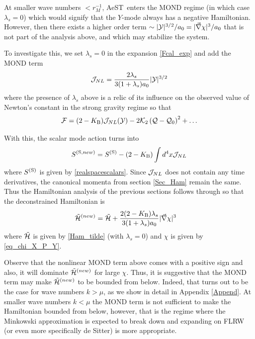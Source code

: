 \documentclass[twocolumn,prd,preprintnumbers,amsmath,amssymb,nofootinbib,superscriptaddress]{revtex4-1}
\newcommand{\scal}{\ensuremath{{\rm S}}}
\newcommand{\grad}{\ensuremath{\vec{\nabla}}}
\newcommand{\AeST}{AeST~}
\newcommand{\lambdas}{\lambda_s}
\newcommand{\Kcal}{{\cal K}}
\newcommand{\Fcal}{{\cal F}}
\newcommand{\Qcal}{{\cal Q}}
\newcommand{\Ycal}{{\cal Y}}
\newcommand{\Hcal}{{\cal H}}
\newcommand{\Jcal}{{\cal J}}
\newcommand{\KB}{\ensuremath{K_{{\rm B}}}}
\begin{document}
At smaller wave numbers $<r_M^{-1}$, \AeST enters the MOND regime (in which case $\lambdas=0$) which would signify that the $Y$-mode always has a negative Hamiltonian. 
However,  then there exists a higher order term $\sim |\Ycal|^{3/2}/a_0 = |\grad \chi|^3/a_0$ that is not part of the analysis above, and  which may stabilize the system.


To investigate this, we set $\lambdas=0$ in the expansion  \eqref{Fcal_exp} and add the MOND term
\begin{align}
\Jcal_{NL} =  \frac{2\lambdas}{3 (1+\lambdas) a_0} |\Ycal|^{3/2}
\end{align}
 where the presence of $\lambdas$ above is a relic of its influence on the observed value of Newton's constant in the strong gravity regime
so that
\begin{equation}
\Fcal =  (2-\KB)  \Jcal_{NL}(\Ycal)  - 2 \Kcal_2  \left(\Qcal - \Qcal_0\right)^2 + \ldots
\label{Fcal_exp}                                                                                                                                                                                  
\end{equation}

 With this, the scalar mode action turns into
\begin{align}
S^{(\scal,new)} = S^{(\scal)} - (2-\KB) \int d^4x  \Jcal_{NL}
\end{align}
where $S^{(\scal)}$ is given by \eqref{realspacescalars}. Since $\Jcal_{NL}$ does not contain any time derivatives, the canonical momenta from section \ref{Sec_Ham} remain the same.
Thus the Hamiltonian analysis of the previous sections follows through so that the deconstrained Hamiltonian is
\begin{align}
\tilde{\Hcal}^{(new)} &=  \tilde{\Hcal} +  \frac{2(2-\KB)\lambdas}{3 (1+\lambdas) a_0} |\grad\chi|^3
\label{Ham_tilde_new}
\end{align}
where $\tilde{\Hcal}$ is given by \eqref{Ham_tilde} (with $\lambdas=0$) and $\chi$ is given by \eqref{eq_chi_X_P_Y}. 

Observe that the nonlinear MOND term above comes with a positive sign and also, it will dominate $\tilde{\Hcal}^{(new)} $ for large $\chi$. Thus,
it is suggestive that the MOND term may make $\tilde{\Hcal}^{(new)} $  to be bounded from below. Indeed, that turns out to be the case for wave numbers $ k > \mu$, as we show in
detail in Appendix \ref{Append}. At smaller wave numbers $k< \mu$ the MOND term is not sufficient to make the Hamiltonian bounded from below, however,
that is the regime where the Minkowski approximation is expected to break down and expanding on FLRW (or even more specifically de Sitter) is more appropriate.
\end{document}

